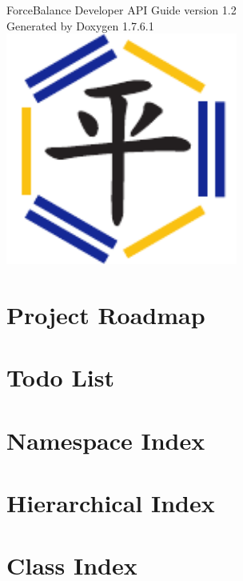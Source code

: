 \documentclass[letterpaper]{article}
\begin{document}
\hypersetup{pageanchor=false,citecolor=blue}
\begin{titlepage}
\vspace*{1cm}
\begin{center}

{\Large ForceBalance Developer API Guide version 1.2}\\
\vspace*{2cm}
{\large Generated by Doxygen 1.7.6.1}\\
\vspace*{2.5 cm}
\includegraphics[width=3in]{ForceBalance}
\end{center}
\end{titlepage}
\tableofcontents
{}
\hypersetup{pageanchor=true,citecolor=blue}
\section{Project Roadmap}
\label{roadmap}
\hypertarget{roadmap}{}

\section{Todo List}
\label{todo}
\hypertarget{todo}{}

\section{Namespace Index}

\section{Hierarchical Index}

\section{Class Index}

\end{document}
